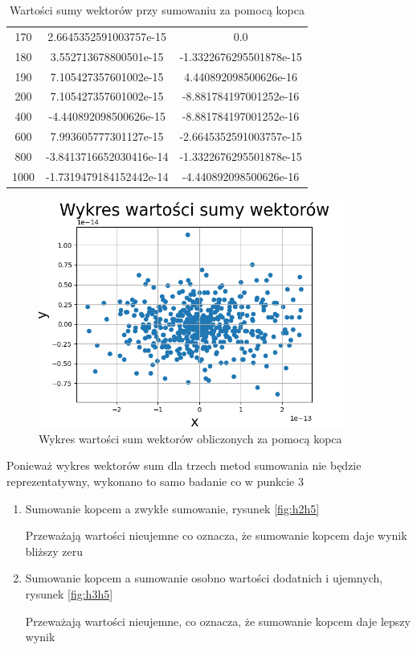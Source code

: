 \documentclass[12pt,a4paper]{article}
\begin{document}
\begin{table}[htbp]
\begin{tabular}{ | c | c | c | }
        170 & 2.6645352591003757e-15 & 0.0 \\
        180 & 3.552713678800501e-15 & -1.3322676295501878e-15 \\
        190 & 7.105427357601002e-15 & 4.440892098500626e-16 \\
        200 & 7.105427357601002e-15 & -8.881784197001252e-16 \\
        400 & -4.440892098500626e-15 & -8.881784197001252e-16 \\
        600 & 7.993605777301127e-15 & -2.6645352591003757e-15 \\
        800 & -3.8413716652030416e-14 & -1.3322676295501878e-15 \\
        1000 & -1.7319479184152442e-14 & -4.440892098500626e-16 \\
       \hline
       \end{tabular}
       \caption{Wartości sumy wektorów przy sumowaniu za pomocą kopca}
       \label{tab:h5}
\end{table}

\begin{figure}[!htb]
    \centering
        \centering
        \includegraphics[width=10cm]{images/heap.png}
        \caption{Wykres wartości sum wektorów obliczonych za pomocą kopca}
        \label{fig:heap}
\end{figure}


Ponieważ wykres wektorów sum dla trzech metod sumowania nie będzie reprezentatywny, wykonano to samo badanie co w punkcie 3

\newpage
\begin{enumerate}
    \item Sumowanie kopcem a zwykłe sumowanie, rysunek \ref{fig:h2h5}

    Przeważają wartości nieujemne co oznacza, że sumowanie kopcem daje wynik bliższy zeru
    \item Sumowanie kopcem a sumowanie osobno wartości dodatnich i ujemnych, rysunek \ref{fig:h3h5}
    
    Przeważają wartości nieujemne, co oznacza, że sumowanie kopcem daje lepszy wynik 
    
\end{enumerate}
\end{document}
